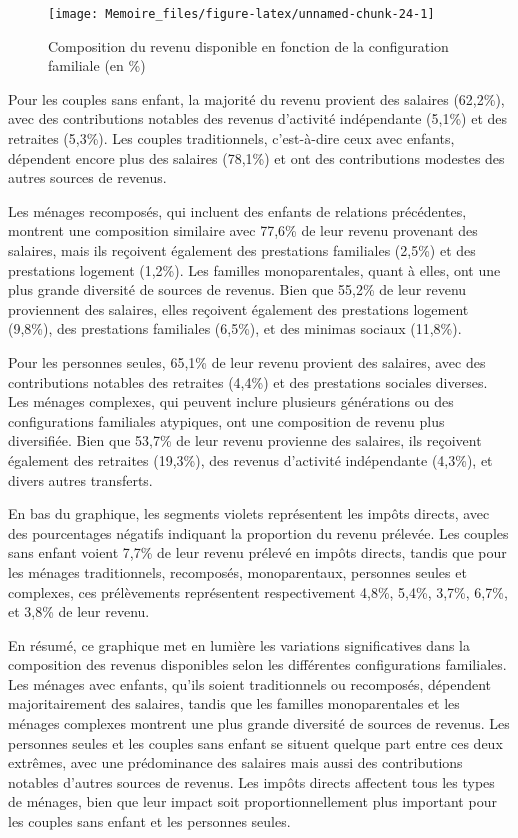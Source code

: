 \documentclass[
  12pt,
]{book}
\begin{document}
\begin{figure}[h]

{\centering \texttt{[image: Memoire\_files/figure-latex/unnamed-chunk-24-1]} 

}

\caption{Composition du revenu disponible en fonction de la configuration familiale (en \%)}\label{fig:unnamed-chunk-24}
\end{figure}

Pour les couples sans enfant, la majorité du revenu provient des
salaires (62,2\%), avec des contributions notables des revenus
d'activité indépendante (5,1\%) et des retraites (5,3\%). Les couples
traditionnels, c'est-à-dire ceux avec enfants, dépendent encore plus des
salaires (78,1\%) et ont des contributions modestes des autres sources
de revenus.

Les ménages recomposés, qui incluent des enfants de relations
précédentes, montrent une composition similaire avec 77,6\% de leur
revenu provenant des salaires, mais ils reçoivent également des
prestations familiales (2,5\%) et des prestations logement (1,2\%). Les
familles monoparentales, quant à elles, ont une plus grande diversité de
sources de revenus. Bien que 55,2\% de leur revenu proviennent des
salaires, elles reçoivent également des prestations logement (9,8\%),
des prestations familiales (6,5\%), et des minimas sociaux (11,8\%).

Pour les personnes seules, 65,1\% de leur revenu provient des salaires,
avec des contributions notables des retraites (4,4\%) et des prestations
sociales diverses. Les ménages complexes, qui peuvent inclure plusieurs
générations ou des configurations familiales atypiques, ont une
composition de revenu plus diversifiée. Bien que 53,7\% de leur revenu
provienne des salaires, ils reçoivent également des retraites (19,3\%),
des revenus d'activité indépendante (4,3\%), et divers autres
transferts.

En bas du graphique, les segments violets représentent les impôts
directs, avec des pourcentages négatifs indiquant la proportion du
revenu prélevée. Les couples sans enfant voient 7,7\% de leur revenu
prélevé en impôts directs, tandis que pour les ménages traditionnels,
recomposés, monoparentaux, personnes seules et complexes, ces
prélèvements représentent respectivement 4,8\%, 5,4\%, 3,7\%, 6,7\%, et
3,8\% de leur revenu.

En résumé, ce graphique met en lumière les variations significatives
dans la composition des revenus disponibles selon les différentes
configurations familiales. Les ménages avec enfants, qu'ils soient
traditionnels ou recomposés, dépendent majoritairement des salaires,
tandis que les familles monoparentales et les ménages complexes montrent
une plus grande diversité de sources de revenus. Les personnes seules et
les couples sans enfant se situent quelque part entre ces deux extrêmes,
avec une prédominance des salaires mais aussi des contributions notables
d'autres sources de revenus. Les impôts directs affectent tous les types
de ménages, bien que leur impact soit proportionnellement plus important
pour les couples sans enfant et les personnes seules.
\end{document}
